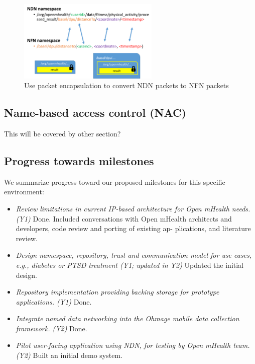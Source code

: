 \documentclass{article}
\begin{document}
\begin{figure}
	\begin{center}
		\includegraphics[width=0.6\textwidth]{ndnnfn.png}
		\caption{Use packet encapsulation to convert NDN packets to NFN packets}
		\label{fig:ndnnfn}
	\end{center}
\end{figure}

\subsection{Name-based access control (NAC)}
This will be covered by other section?

\subsection{Progress towards milestones}
We summarize progress toward our proposed milestones for this specific environment:
\begin{itemize}
	\item \textit{Review limitations in current IP-based architecture for Open mHealth needs. (Y1)} Done. Included conversations with Open mHealth architects and developers, code review and porting of existing ap- plications, and literature review. 
	\item \textit{Design namespace, repository, trust and communication model for use cases, e.g., diabetes or PTSD treatment (Y1; updated in Y2)} Updated the initial design.
	\item \textit {Repository implementation providing backing storage for prototype applications. (Y1)} Done.
	\item \textit {Integrate named data networking into the Ohmage mobile data collection framework. (Y2)} Done.
	\item \textit {Pilot user-facing application using NDN, for testing by Open mHealth team. (Y2)} Built an initial demo system.
\end{itemize}
\end{document}
